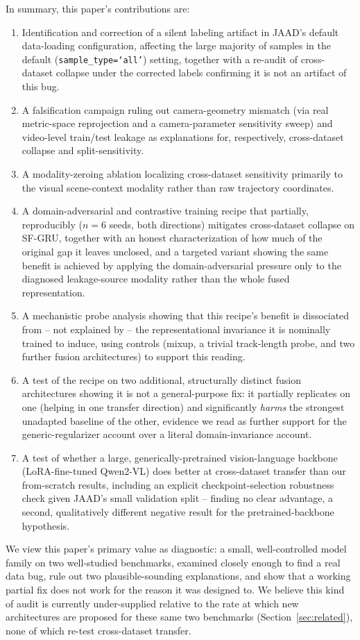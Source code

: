 In summary, this paper's contributions are:

\begin{enumerate}
\item Identification and correction of a silent labeling artifact in
JAAD's default data-loading configuration, affecting the large
majority of samples in the default (\texttt{sample\_type=`all'})
setting, together with a re-audit of cross-dataset collapse under the
corrected labels confirming it is not an artifact of this bug.
\item A falsification campaign ruling out camera-geometry mismatch
(via real metric-space reprojection and a camera-parameter sensitivity
sweep) and video-level train/test leakage as explanations for,
respectively, cross-dataset collapse and split-sensitivity.
\item A modality-zeroing ablation localizing cross-dataset sensitivity
primarily to the visual scene-context modality rather than raw
trajectory coordinates.
\item A domain-adversarial and contrastive training recipe that
partially, reproducibly ($n=6$ seeds, both directions) mitigates
cross-dataset collapse on SF-GRU, together with an honest
characterization of how much of the original gap it leaves unclosed,
and a targeted variant showing the same benefit is achieved by applying
the domain-adversarial pressure only to the diagnosed leakage-source
modality rather than the whole fused representation.
\item A mechanistic probe analysis showing that this recipe's benefit
is dissociated from -- not explained by -- the representational
invariance it is nominally trained to induce, using controls (mixup, a
trivial track-length probe, and two further fusion architectures) to
support this reading.
\item A test of the recipe on two additional, structurally distinct
fusion architectures showing it is not a general-purpose fix: it
partially replicates on one (helping in one transfer direction) and
significantly \emph{harms} the strongest unadapted baseline of the
other, evidence we read as further support for the generic-regularizer
account over a literal domain-invariance account.
\item A test of whether a large, generically-pretrained
vision-language backbone (LoRA-fine-tuned Qwen2-VL) does better at
cross-dataset transfer than our from-scratch results, including an
explicit checkpoint-selection robustness check given JAAD's small
validation split -- finding no clear advantage, a second, qualitatively
different negative result for the pretrained-backbone hypothesis.
\end{enumerate}

We view this paper's primary value as diagnostic: a small,
well-controlled model family on two well-studied benchmarks, examined
closely enough to find a real data bug, rule out two plausible-sounding
explanations, and show that a working partial fix does not work for
the reason it was designed to. We believe this kind of audit is
currently under-supplied relative to the rate at which new
architectures are proposed for these same two benchmarks
(Section~\ref{sec:related}), none of which re-test cross-dataset
transfer.

